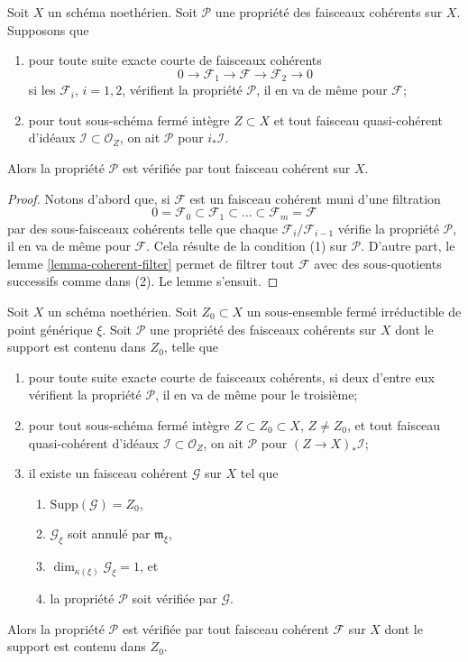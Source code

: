 \begin{lemma}
\label{lemma-property-initial}
Soit $X$ un schéma noethérien.
Soit $\mathcal{P}$ une propriété des faisceaux cohérents sur $X$. Supposons que
\begin{enumerate}
\item pour toute suite exacte courte de faisceaux cohérents
$$
0 \to \mathcal{F}_1 \to \mathcal{F} \to \mathcal{F}_2 \to 0
$$
si les $\mathcal{F}_i$, $i = 1, 2$, vérifient la propriété $\mathcal{P}$,
il en va de même pour $\mathcal{F}$;
\item pour tout sous-schéma fermé intègre $Z \subset X$
et tout faisceau quasi-cohérent d'idéaux
$\mathcal{I} \subset \mathcal{O}_Z$, on ait
$\mathcal{P}$ pour $i_*\mathcal{I}$.
\end{enumerate}
Alors la propriété $\mathcal{P}$ est vérifiée par tout faisceau cohérent
sur $X$.
\end{lemma}

\begin{proof}
Notons d'abord que, si $\mathcal{F}$ est un faisceau cohérent muni d'une filtration
$$
0 = \mathcal{F}_0 \subset \mathcal{F}_1 \subset
\ldots \subset \mathcal{F}_m = \mathcal{F}
$$
par des sous-faisceaux cohérents telle que chaque $\mathcal{F}_i/\mathcal{F}_{i - 1}$
vérifie la propriété $\mathcal{P}$, il en va de même pour $\mathcal{F}$.
Cela résulte de la condition (1) sur $\mathcal{P}$.
D'autre part, le lemme \ref{lemma-coherent-filter}
permet de filtrer tout $\mathcal{F}$
avec des sous-quotients successifs comme dans
(2). Le lemme s'ensuit.
\end{proof}

\begin{lemma}
\label{lemma-property-irreducible}
Soit $X$ un schéma noethérien. Soit $Z_0 \subset X$ un sous-ensemble fermé irréductible
de point générique $\xi$. Soit $\mathcal{P}$ une propriété des faisceaux
cohérents sur $X$ dont le support est contenu dans $Z_0$, telle que
\begin{enumerate}
\item pour toute suite exacte courte de faisceaux cohérents, si
deux d'entre eux vérifient la propriété $\mathcal{P}$, il en va de même pour
le troisième;
\item pour tout sous-schéma fermé intègre $Z \subset Z_0 \subset X$,
$Z \not = Z_0$, et tout faisceau quasi-cohérent d'idéaux
$\mathcal{I} \subset \mathcal{O}_Z$, on ait
$\mathcal{P}$ pour $(Z \to X)_*\mathcal{I}$;
\item il existe un faisceau cohérent $\mathcal{G}$ sur $X$ tel que
\begin{enumerate}
\item $\text{Supp}(\mathcal{G}) = Z_0$,
\item $\mathcal{G}_\xi$ soit annulé par $\mathfrak m_\xi$,
\item $\dim_{\kappa(\xi)} \mathcal{G}_\xi = 1$, et
\item la propriété $\mathcal{P}$ soit vérifiée par $\mathcal{G}$.
\end{enumerate}
\end{enumerate}
Alors la propriété $\mathcal{P}$ est vérifiée par tout faisceau cohérent
$\mathcal{F}$ sur $X$ dont le support est contenu dans $Z_0$.
\end{lemma}

